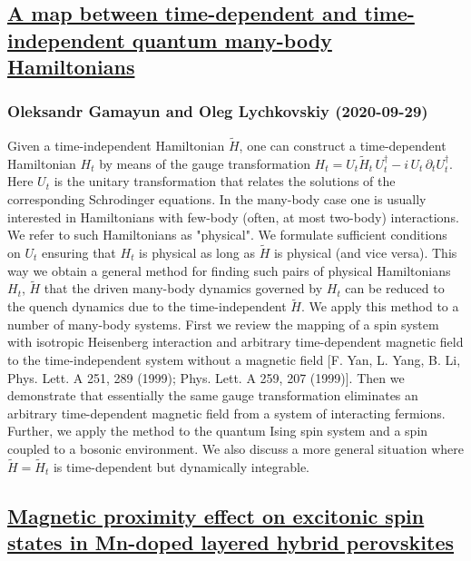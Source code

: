 \subsection*{\href{http://arxiv.org/abs/2009.13873v1}{A map between time-dependent and time-independent quantum many-body  Hamiltonians}}
\subsubsection*{Oleksandr Gamayun and Oleg Lychkovskiy (2020-09-29)}
Given a time-independent Hamiltonian $\widetilde H$, one can construct a
time-dependent Hamiltonian $H_t$ by means of the gauge transformation $H_t=U_t
\widetilde H_t \, U^\dagger_t-i\, U_t\, \partial_t U_t^\dagger$. Here $U_t$ is
the unitary transformation that relates the solutions of the corresponding
Schrodinger equations. In the many-body case one is usually interested in
Hamiltonians with few-body (often, at most two-body) interactions. We refer to
such Hamiltonians as "physical". We formulate sufficient conditions on $U_t$
ensuring that $H_t$ is physical as long as $\widetilde H$ is physical (and vice
versa). This way we obtain a general method for finding such pairs of physical
Hamiltonians $H_t$, $\widetilde H$ that the driven many-body dynamics governed
by $H_t$ can be reduced to the quench dynamics due to the time-independent
$\widetilde H$. We apply this method to a number of many-body systems. First we
review the mapping of a spin system with isotropic Heisenberg interaction and
arbitrary time-dependent magnetic field to the time-independent system without
a magnetic field [F. Yan, L. Yang, B. Li, Phys. Lett. A 251, 289 (1999); Phys.
Lett. A 259, 207 (1999)]. Then we demonstrate that essentially the same gauge
transformation eliminates an arbitrary time-dependent magnetic field from a
system of interacting fermions. Further, we apply the method to the quantum
Ising spin system and a spin coupled to a bosonic environment. We also discuss
a more general situation where $\widetilde H = \widetilde H_t$ is
time-dependent but dynamically integrable.

\subsection*{\href{http://arxiv.org/abs/2009.13867v1}{Magnetic proximity effect on excitonic spin states in Mn-doped layered  hybrid perovskites}}
